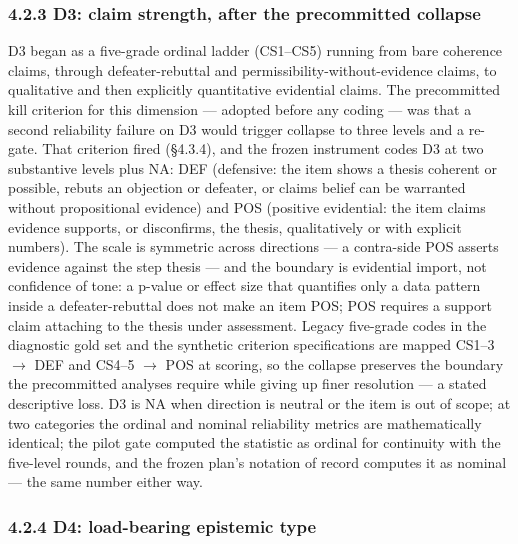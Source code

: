 \subsubsection{4.2.3 D3: claim strength, after the precommitted collapse}\label{d3-claim-strength-after-the-precommitted-collapse}

D3 began as a five-grade ordinal ladder (CS1--CS5) running from bare coherence claims, through defeater-rebuttal and permissibility-without-evidence claims, to qualitative and then explicitly quantitative evidential claims. The precommitted kill criterion for this dimension --- adopted before any coding --- was that a second reliability failure on D3 would trigger collapse to three levels and a re-gate. That criterion fired (\S{}4.3.4), and the frozen instrument codes D3 at two substantive levels plus NA: DEF (defensive: the item shows a thesis coherent or possible, rebuts an objection or defeater, or claims belief can be warranted without propositional evidence) and POS (positive evidential: the item claims evidence supports, or disconfirms, the thesis, qualitatively or with explicit numbers). The scale is symmetric across directions --- a contra-side POS asserts evidence against the step thesis --- and the boundary is evidential import, not confidence of tone: a p-value or effect size that quantifies only a data pattern inside a defeater-rebuttal does not make an item POS; POS requires a support claim attaching to the thesis under assessment. Legacy five-grade codes in the diagnostic gold set and the synthetic criterion specifications are mapped CS1--3 $\to$ DEF and CS4--5 $\to$ POS at scoring, so the collapse preserves the boundary the precommitted analyses require while giving up finer resolution --- a stated descriptive loss. D3 is NA when direction is neutral or the item is out of scope; at two categories the ordinal and nominal reliability metrics are mathematically identical; the pilot gate computed the statistic as ordinal for continuity with the five-level rounds, and the frozen plan's notation of record computes it as nominal --- the same number either way.

\subsubsection{4.2.4 D4: load-bearing epistemic type}\label{d4-load-bearing-epistemic-type}

